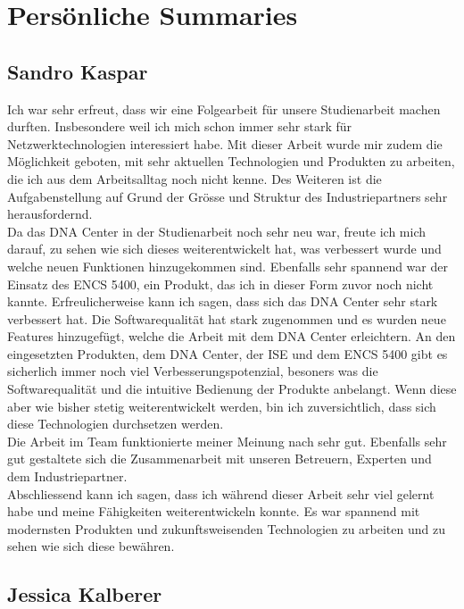 \section{Persönliche Summaries}

\subsection{Sandro Kaspar}

Ich war sehr erfreut, dass wir eine Folgearbeit für unsere Studienarbeit machen durften. Insbesondere weil ich mich schon immer sehr stark für Netzwerktechnologien interessiert habe. Mit dieser Arbeit wurde mir zudem die Möglichkeit geboten, mit sehr aktuellen Technologien und Produkten zu arbeiten, die ich aus dem Arbeitsalltag noch nicht kenne. Des Weiteren ist die Aufgabenstellung auf Grund der Grösse und Struktur des Industriepartners sehr herausfordernd.\\
Da das DNA Center in der Studienarbeit noch sehr neu war, freute ich mich darauf, zu sehen wie sich dieses weiterentwickelt hat, was verbessert wurde und welche neuen Funktionen hinzugekommen sind. Ebenfalls sehr spannend war der Einsatz des ENCS 5400, ein Produkt, das ich in dieser Form zuvor noch nicht kannte. 
Erfreulicherweise kann ich sagen, dass sich das DNA Center sehr stark verbessert hat. Die Softwarequalität hat stark zugenommen und es wurden neue Features hinzugefügt, welche die Arbeit mit dem DNA Center erleichtern. An den eingesetzten Produkten, dem DNA Center, der ISE und dem ENCS 5400 gibt es sicherlich immer noch viel Verbesserungspotenzial, besoners was die Softwarequalität und die intuitive Bedienung der Produkte anbelangt. Wenn diese aber wie bisher stetig weiterentwickelt werden, bin ich zuversichtlich, dass sich diese Technologien durchsetzen werden.\\
Die Arbeit im Team funktionierte meiner Meinung nach sehr gut. Ebenfalls sehr gut gestaltete sich die Zusammenarbeit mit unseren Betreuern, Experten und dem Industriepartner. \\
Abschliessend kann ich sagen, dass ich während dieser Arbeit sehr viel gelernt habe und meine Fähigkeiten weiterentwickeln konnte. Es war spannend mit modernsten Produkten und zukunftsweisenden Technologien zu arbeiten und zu sehen wie sich diese bewähren.

\subsection{Jessica Kalberer}

